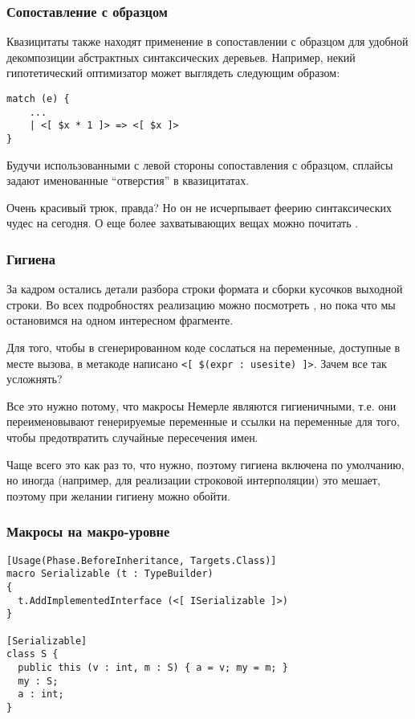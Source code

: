 \documentclass[hyperref={bookmarks=false}]{beamer}
\begin{document}
\begin{frame}[t, fragile]
\frametitle{Сопоставление с образцом}

Квазицитаты также находят применение в сопоставлении с образцом для удобной декомпозиции абстрактных синтаксических деревьев. Например, некий гипотетический оптимизатор может выглядеть следующим образом:

\begin{lstlisting}[language=nemerle]
match (e) { 
    ... 
    | <[ $x * 1 ]> => <[ $x ]> 
} 
\end{lstlisting}

Будучи использованными с левой стороны сопоставления с образцом, сплайсы задают именованные ``отверстия'' в квазицитатах. 

Очень красивый трюк, правда? Но он не исчерпывает феерию синтаксических чудес на сегодня. О еще более захватывающих вещах можно почитать .

\end{frame}

\begin{frame}[t]
\frametitle{Гигиена}

За кадром остались детали разбора строки формата и сборки кусочков выходной строки. Во всех подробностях реализацию можно посмотреть , но пока что мы остановимся на одном интересном фрагменте.

Для того, чтобы в сгенерированном коде сослаться на переменные, доступные в месте вызова, в метакоде написано \texttt{<[ \$(expr : usesite) ]>}. Зачем все так усложнять?

Все это нужно потому, что макросы Немерле являются гигиеничными, т.е. они переименовывают генерируемые переменные и ссылки на переменные для того, чтобы предотвратить случайные пересечения имен. 

Чаще всего это как раз то, что нужно, поэтому гигиена включена по умолчанию, но иногда (например, для реализации строковой интерполяции) это мешает, поэтому при желании гигиену можно обойти.

\end{frame}

\begin{frame}[t, fragile]
\frametitle{Макросы на макро-уровне}

\begin{lstlisting}[language=nemerle]
[Usage(Phase.BeforeInheritance, Targets.Class)] 
macro Serializable (t : TypeBuilder) 
{ 
  t.AddImplementedInterface (<[ ISerializable ]>) 
} 
 
[Serializable] 
class S { 
  public this (v : int, m : S) { a = v; my = m; } 
  my : S; 
  a : int; 
} 
\end{lstlisting}
\end{frame}
\end{document}
